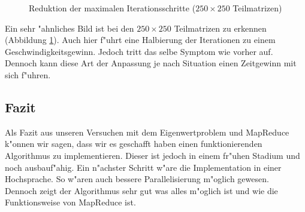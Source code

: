 \begin{refsection}
\begin{figure}
\begin{center}
\end{center}
\caption{Reduktion der maximalen Iterationsschritte ($250\times250$ Teilmatrizen)}
\label{ww}
\end{figure}
Ein sehr "ahnliches Bild ist bei den $250\times250$ Teilmatrizen zu erkennen (Abbildung \ref{ww}). Auch hier f"uhrt eine Halbierung der Iterationen zu einem Geschwindigkeitsgewinn. Jedoch tritt das selbe Symptom wie vorher auf. Dennoch kann diese Art der Anpassung je nach Situation einen Zeitgewinn mit sich f"uhren.
\subsection{Fazit}
Als Fazit aus unseren Versuchen mit dem Eigenwertproblem und MapReduce k"onnen wir sagen, dass wir es geschafft haben einen funktionierenden Algorithmus zu implementieren. Dieser ist jedoch in einem fr"uhen Stadium und noch ausbauf"ahig. Ein n"achster Schritt w"are die Implementation in einer Hochsprache. So w"aren auch bessere Parallelisierung m"oglich gewesen.\\
Dennoch zeigt der Algorithmus sehr gut was alles m"oglich ist und wie die Funktionsweise von MapReduce ist.

\printbibliography[heading=subbibliography]
\end{refsection}

